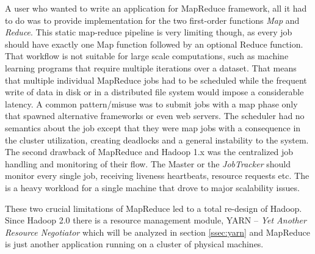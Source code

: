 A user who wanted to write an application for MapReduce framework,
all it had to do was to provide implementation for the two
first-order functions \emph{Map} and \emph{Reduce}. This static
map-reduce pipeline is very limiting though, as every job should have exactly one
Map function followed by an optional Reduce function. That workflow is
not suitable for large scale computations, such as machine learning
programs that require multiple iterations over a dataset. That means
that multiple individual MapReduce jobs had to be scheduled while the
frequent write of data in disk or in a distributed file system would
impose a considerable latency. A common pattern/misuse
\cite{Vavilapalli:2013:AHY:2523616.2523633} was to submit jobs with a
map phase only that spawned alternative frameworks or even web
servers. The scheduler had no semantics about the job except that they
were map jobs with a consequence in the cluster utilization, creating
deadlocks and a general instability to the system. The second drawback
of MapReduce and Hadoop 1.x was the centralized job handling and
monitoring of their flow. The Master or the \emph{JobTracker} should
monitor every single job, receiving liveness heartbeats, resource
requests etc. The is a heavy workload for a single machine that drove
to major scalability issues.

These two crucial limitations of MapReduce led to a total re-design of
Hadoop. Since Hadoop 2.0 there is a resource management module, YARN --
\emph{Yet Another Resource Negotiator} which will be analyzed in
section \ref{ssec:yarn} and MapReduce is just another application
running on a cluster of physical machines.
